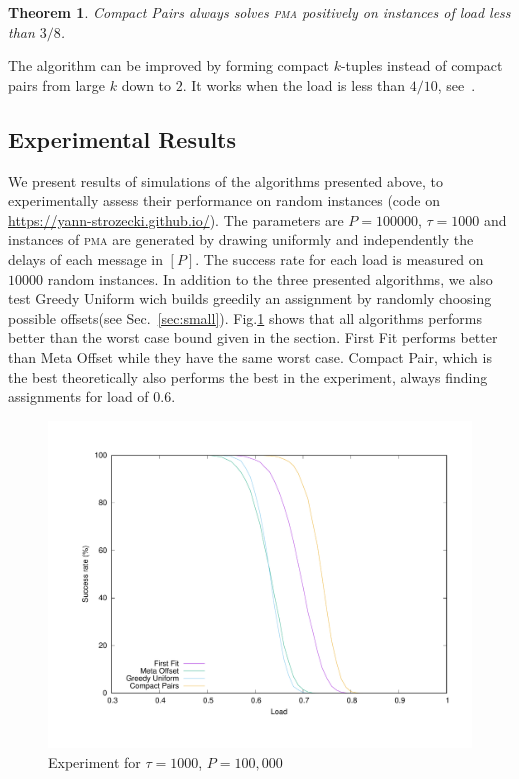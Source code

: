 \documentclass[10pt, conference, letterpaper]{algotel}
\newtheorem{theorem}{Theorem}
\newcommand\pma{\textsc{pma}\xspace}
\begin{document}
\begin{theorem}
Compact Pairs always solves \pma positively on instances of load less than
$3/8$.
\end{theorem}

The algorithm can be improved by forming compact $k$-tuples instead of compact pairs
from large $k$ down to $2$. It works when the load is less than $4/10$, see~\cite{}. 


\subsection{Experimental Results} \label{sec:perf_large}

We present results of simulations of the algorithms presented above, to experimentally assess their performance on random instances (code on \url{https://yann-strozecki.github.io/}). The parameters are $P = 100000$, $\tau = 1000$ and instances of \pma are generated by drawing uniformly and independently the delays of each message in $[P]$.
The success rate for each load is measured on $10000$ random instances. In addition to the three presented algorithms, we also test Greedy Uniform wich builds greedily an assignment by randomly choosing possible offsets(see Sec.~\ref{sec:small}). Fig.\ref{fig:100messBig} shows that all algorithms performs better than the worst case bound given in the section. First Fit performs better than Meta Offset while they have the same worst case. Compact Pair, which is the best theoretically also performs the best in the experiment, always finding assignments for load of $0.6$. 

\begin{figure}
\begin{center}
\includegraphics[scale=0.2]{100messBig}
\end{center}
\caption{Experiment for $\tau = 1000$, $P=100,000$}
\label{fig:100messBig}
\end{figure}
\end{document}
